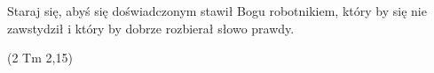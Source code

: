 
\clearpage

\begin{adjustwidth}{0.23\textwidth}{0.23\textwidth}
	\begingroup
	\null\vspace{0.3\textheight}
	\Large\itshape
	\begin{center}
		Staraj się, abyś się doświadczonym stawił Bogu robotnikiem, który by się nie zawstydził i który by dobrze rozbierał słowo prawdy.
	\end{center}
	\begin{flushright}
		(2 Tm 2,15)
	\end{flushright}
	\endgroup
\end{adjustwidth}

\clearpage